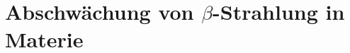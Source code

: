 \documentclass[../protokoll.tex]{subfiles}
\begin{document}
\section{Abschwächung von \texorpdfstring{$\beta$}{Beta}-Strahlung in Materie}\label{sec:Abschwächung Beta-Strahlung}
\end{document}
